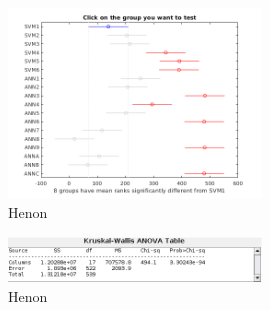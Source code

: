 \documentclass[a4paper,openwrite,12pt]{article}
\begin{document}
\begin{figure}[H]
\centering
\includegraphics[width=0.6\textwidth]{img/ranks_henon.png}
\caption{Henon}
\end{figure}


\begin{figure}[H]
\centering
\includegraphics[width=0.6\textwidth]{img/anova_henon.png}
\caption{Henon}
\end{figure}

\newpage
\listoftables
\end{document}
